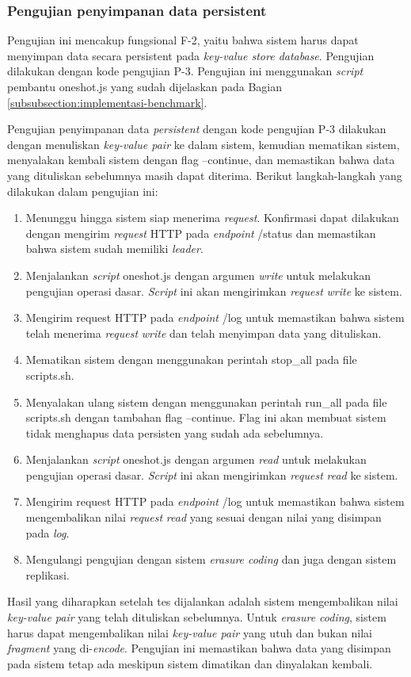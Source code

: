\subsubsection{Pengujian penyimpanan data persistent}
\label{subsubsection:pengujian-penyimpanan-data-persistent}

Pengujian ini mencakup fungsional F-2, yaitu bahwa sistem harus dapat menyimpan data secara persistent pada \textit{key-value store database}. Pengujian dilakukan dengan kode pengujian P-3. Pengujian ini menggunakan \textit{script} pembantu oneshot.js yang sudah dijelaskan pada Bagian \ref{subsubsection:implementasi-benchmark}.

Pengujian penyimpanan data \textit{persistent} dengan kode pengujian P-3 dilakukan dengan menuliskan \textit{key-value pair} ke dalam sistem, kemudian mematikan sistem, menyalakan kembali sistem dengan flag --continue, dan memastikan bahwa data yang dituliskan sebelumnya masih dapat diterima. Berikut langkah-langkah yang dilakukan dalam pengujian ini:

\begin{enumerate}
  \item Menunggu hingga sistem siap menerima \textit{request}. Konfirmasi dapat dilakukan dengan mengirim \textit{request} HTTP pada \textit{endpoint} /status dan memastikan bahwa sistem sudah memiliki \textit{leader}.
  \item Menjalankan \textit{script} oneshot.js dengan argumen \textit{write} untuk melakukan pengujian operasi dasar. \textit{Script} ini akan mengirimkan \textit{request} \textit{write} ke sistem.
  \item Mengirim request HTTP pada \textit{endpoint} /log untuk memastikan bahwa sistem telah menerima \textit{request} \textit{write} dan telah menyimpan data yang dituliskan.
  \item Mematikan sistem dengan menggunakan perintah stop\_all pada file scripts.sh.
  \item Menyalakan ulang sistem dengan menggunakan perintah run\_all pada file scripts.sh dengan tambahan flag --continue. Flag ini akan membuat sistem tidak menghapus data persisten yang sudah ada sebelumnya.
  \item Menjalankan \textit{script} oneshot.js dengan argumen \textit{read} untuk melakukan pengujian operasi dasar. \textit{Script} ini akan mengirimkan \textit{request} \textit{read} ke sistem.
  \item Mengirim request HTTP pada \textit{endpoint} /log untuk memastikan bahwa sistem mengembalikan nilai \textit{request} \textit{read} yang sesuai dengan nilai yang disimpan pada \textit{log}.
  \item Mengulangi pengujian dengan sistem \textit{erasure coding} dan juga dengan sistem replikasi.
\end{enumerate}

Hasil yang diharapkan setelah tes dijalankan adalah sistem mengembalikan nilai \textit{key-value pair} yang telah dituliskan sebelumnya. Untuk \textit{erasure coding}, sistem harus dapat mengembalikan nilai \textit{key-value pair} yang utuh dan bukan nilai \textit{fragment} yang di-\textit{encode}. Pengujian ini memastikan bahwa data yang disimpan pada sistem tetap ada meskipun sistem dimatikan dan dinyalakan kembali.